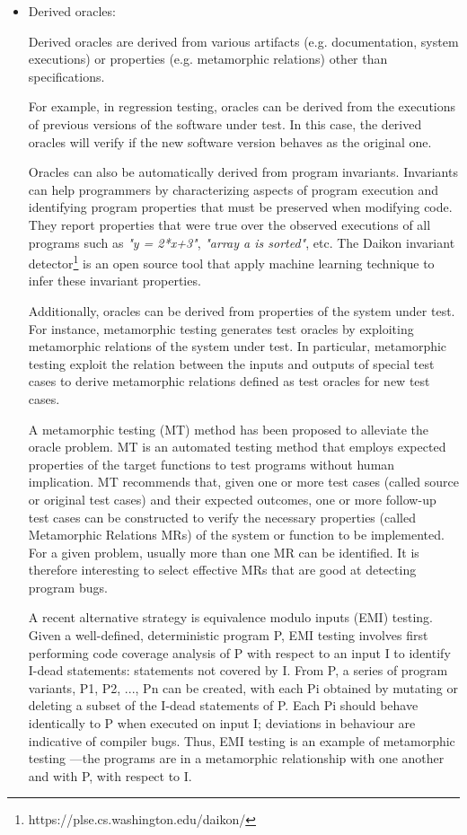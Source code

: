 \begin{itemize}
	
	\item Derived oracles:
	
	Derived oracles are derived from various artifacts (e.g. documentation, system executions) or properties (e.g. metamorphic relations) other than specifications.
	
	For example, in regression testing, oracles can be derived from the executions of previous versions of the software under test. In this
	case, the derived oracles will verify if the new software version behaves as the original one\cite{mariani2007compatibility}. 
	
	Oracles can also be automatically derived from program invariants\cite{ernst2000quickly}. Invariants can help programmers by characterizing aspects of program execution and identifying program properties that must be preserved when modifying code. They report properties that were true over the observed executions of all programs such as \textit{"y = 2*x+3"}, \textit{"array a is sorted"}, etc. The Daikon invariant detector\footnote{https://plse.cs.washington.edu/daikon/} is an open source tool that apply machine learning technique to infer these invariant properties.
	
	Additionally, oracles can be derived from properties of the system under test. For instance, metamorphic testing\cite{chen2004case} generates test oracles by exploiting metamorphic relations of the system under test. In particular, metamorphic testing exploit the relation between the inputs and outputs of special test cases to derive metamorphic relations defined as test oracles for new test cases. 
	
	A metamorphic testing (MT) method has been proposed to alleviate the oracle problem\cite{chen2004case}. MT is an automated testing method that employs expected properties of the target functions to test programs without human implication. 
	MT recommends that, given one or more test cases (called source or original test cases) and their expected outcomes, one or more follow-up test cases can be constructed to verify the necessary properties (called Metamorphic Relations MRs) of the system or function to be implemented.
	For a given problem, usually more than one MR can be identified. It is therefore interesting to select effective MRs that are good at detecting program bugs.
	
	A recent alternative strategy is equivalence modulo inputs (EMI) testing. Given a well-defined, deterministic program P, EMI testing involves first performing code coverage analysis of P with respect to an input I to identify I-dead statements: statements not covered by I. From P, a series of program variants, P1, P2, ..., Pn can be created, with each Pi obtained by mutating or deleting a subset of the I-dead
	statements of P. Each Pi should behave identically to P
	when executed on input I; deviations in behaviour are indicative
	of compiler bugs. Thus, EMI testing is an example
	of metamorphic testing —the programs are in a metamorphic
	relationship with one another and with P, with respect
	to I.
	

\end{itemize}
